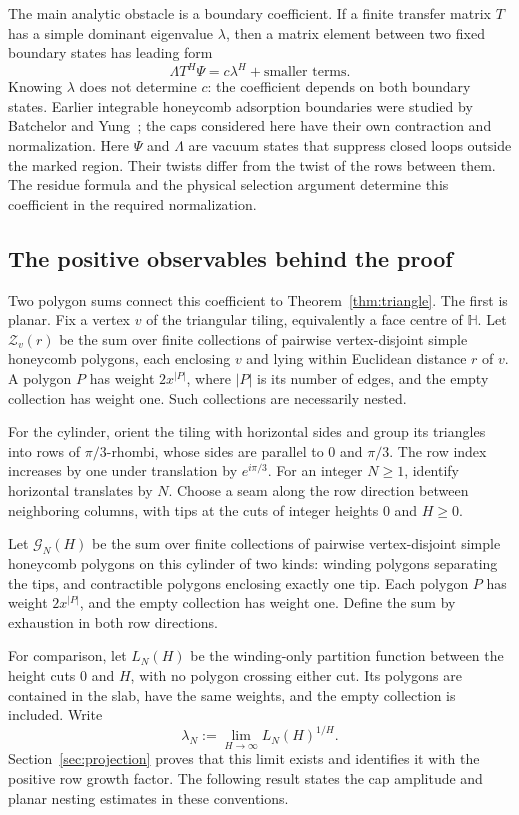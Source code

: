 The main analytic obstacle is a boundary coefficient. If a finite transfer matrix $T$ has a simple dominant eigenvalue $\lambda$, then a matrix element between two fixed boundary states has leading form
\[
 \Lambda T^H\Psi=c\lambda^H+\text{smaller terms}.
\]
Knowing $\lambda$ does not determine $c$: the coefficient depends on both boundary states. Earlier integrable honeycomb adsorption boundaries were studied by Batchelor and Yung~\cite{BatchelorYung1995}; the caps considered here have their own contraction and normalization. Here $\Psi$ and $\Lambda$ are vacuum states that suppress closed loops outside the marked region. Their twists differ from the twist of the rows between them. The residue formula and the physical selection argument determine this coefficient in the required normalization.

\subsection{The positive observables behind the proof}

Two polygon sums connect this coefficient to Theorem~\ref{thm:triangle}. The first is planar. Fix a vertex $v$ of the triangular tiling, equivalently a face centre of $\mathbb H$. Let $\mathcal Z_v(r)$ be the sum over finite collections of pairwise vertex-disjoint simple honeycomb polygons, each enclosing $v$ and lying within Euclidean distance $r$ of $v$. A polygon $P$ has weight $2x^{|P|}$, where $|P|$ is its number of edges, and the empty collection has weight one. Such collections are necessarily nested.

For the cylinder, orient the tiling with horizontal sides and group its
triangles into rows of $\pi/3$-rhombi, whose sides are parallel to $0$
and $\pi/3$. The row index increases by one under translation by
$e^{i\pi/3}$. For an integer $N\ge1$, identify horizontal translates
by $N$. Choose a seam along the row direction between neighboring
columns, with tips at the cuts of integer heights $0$ and $H\ge0$.

Let $\mathcal G_N(H)$ be the sum over finite collections of pairwise
vertex-disjoint simple honeycomb polygons on this cylinder of two kinds:
winding polygons separating the tips, and contractible polygons
enclosing exactly one tip. Each polygon $P$ has weight $2x^{|P|}$,
and the empty collection has weight one. Define the sum by exhaustion
in both row directions.

For comparison, let $L_N(H)$ be the winding-only partition function
between the height cuts $0$ and $H$, with no polygon crossing either
cut. Its polygons are contained in the slab, have the same weights,
and the empty collection is included. Write
\[
 \lambda_N:=\lim_{H\to\infty}L_N(H)^{1/H}.
\]
Section~\ref{sec:projection} proves that this limit exists and identifies
it with the positive row growth factor. The following result states the
cap amplitude and planar nesting estimates in these conventions.


